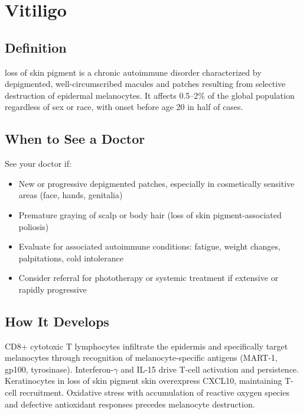 \chapter{Vitiligo}

\section*{Definition}
loss of skin pigment is a chronic autoimmune disorder characterized by depigmented, well-circumscribed macules and patches resulting from selective destruction of epidermal melanocytes. It affects 0.5--2\% of the global population regardless of sex or race, with onset before age 20 in half of cases.

\section*{When to See a Doctor}
See your doctor if:
\begin{itemize}
  \item New or progressive depigmented patches, especially in cosmetically sensitive areas (face, hands, genitalia)
  \item Premature graying of scalp or body hair (loss of skin pigment-associated poliosis)
  \item Evaluate for associated autoimmune conditions: fatigue, weight changes, palpitations, cold intolerance
  \item Consider referral for phototherapy or systemic treatment if extensive or rapidly progressive
\end{itemize}

\section*{How It Develops}
CD8+ cytotoxic T lymphocytes infiltrate the epidermis and specifically target melanocytes through recognition of melanocyte-specific antigens (MART-1, gp100, tyrosinase). Interferon-\ensuremath{\gamma} and IL-15 drive T-cell activation and persistence. Keratinocytes in loss of skin pigment skin overexpress CXCL10, maintaining T-cell recruitment. Oxidative stress with accumulation of reactive oxygen species and defective antioxidant responses precedes melanocyte destruction.

